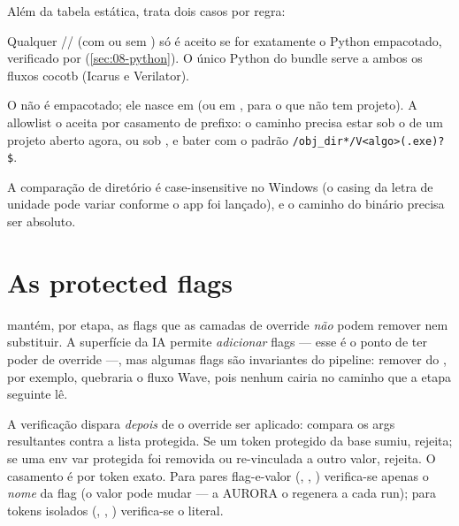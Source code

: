 Além da tabela estática,  trata dois casos por regra:

\begin{description}[leftmargin=1.4em]
  \item[Python.] Qualquer // (com ou sem
    ) só é aceito se for exatamente o Python empacotado, verificado
    por  (\autoref{sec:08-python}). O único Python do
    bundle serve a ambos os fluxos cocotb (Icarus e Verilator).
  \item[Executável gerado pelo Verilator.] O  não é empacotado;
    ele nasce em  (ou em
    , para o que não tem projeto). A allowlist o aceita
    por casamento de prefixo: o caminho precisa estar sob o 
    de um projeto aberto agora, ou sob , e bater com o
    padrão \lstinline|/obj_dir*/V<algo>(.exe)?$|.
\end{description}

\noindent A comparação de diretório é case-insensitive no Windows (o
casing da letra de unidade pode variar conforme o app foi lançado), e o caminho
do binário precisa ser absoluto.

\section{As protected flags}
\label{sec:08-protected}

 mantém, por etapa, as flags que as camadas
de override \emph{não} podem remover nem substituir. A superfície da IA permite
\emph{adicionar} flags — esse é o ponto de ter poder de override —, mas algumas
flags são invariantes do pipeline: remover  do
, por exemplo, quebraria o fluxo Wave, pois nenhum
 cairia no caminho que a etapa seguinte lê.

A verificação dispara \emph{depois} de o override ser aplicado: compara os args
resultantes contra a lista protegida. Se um token protegido da base sumiu,
rejeita; se uma env var protegida foi removida ou re-vinculada a outro valor,
rejeita. O casamento é por token exato. Para pares flag-e-valor (,
, ) verifica-se apenas o \emph{nome} da flag (o valor
pode mudar — a AURORA o regenera a cada run); para tokens isolados
(, , ) verifica-se o literal.

